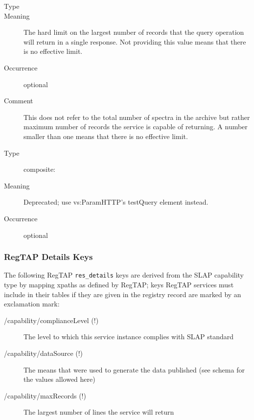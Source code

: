\documentclass[11pt,a4paper]{ivoa}
\begin{document}
\begin{generated}
\begin{bigdescription}
\begin{description}
\end{description}
\item[Element \xmlel{maxRecords}]
\begin{description}
\item[Type] 
\item[Meaning] The hard limit on the largest number of records that
                        the query operation will return in a single response.
                        Not providing this value means that there is no
                        effective limit.
\item[Occurrence] optional
\item[Comment] This does not refer to the total number of spectra in
                        the archive but rather maximum number of records the
                        service is capable of returning.  A number smaller
                        than one means that there is no effective limit.

\end{description}
\item[Element \xmlel{testQuery}]
\begin{description}
\item[Type] composite: 
\item[Meaning] Deprecated; use vs:ParamHTTP's testQuery element
                        instead.
\item[Occurrence] optional

\end{description}


\end{bigdescription}\endgroup

\endgroup
\end{generated}


\subsubsection{RegTAP Details Keys}

The following RegTAP \verb|res_details| keys are derived from the
SLAP capability type by mapping xpaths as defined by RegTAP; keys RegTAP
services must include in their tables if they are given in the registry
record are marked by an exclamation mark:

\begin{description}
\item[/capability/complianceLevel (!)] The level to which this service instance complies with SLAP standard
\item[/capability/dataSource (!)] The means that were used to generate the data published (see schema for the values allowed here)
\item[/capability/maxRecords (!)] The largest number of lines the service will return
\end{description}
\end{document}
